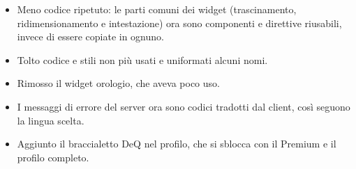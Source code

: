 \begin{itemize}[itemsep=-2pt]
    \item Meno codice ripetuto: le parti comuni dei widget (trascinamento, ridimensionamento e intestazione) ora sono componenti e direttive riusabili, invece di essere copiate in ognuno.
    \item Tolto codice e stili non più usati e uniformati alcuni nomi.
    \item Rimosso il widget orologio, che aveva poco uso.
    \item I messaggi di errore del server ora sono codici tradotti dal client, così seguono la lingua scelta.
    \item Aggiunto il braccialetto DeQ nel profilo, che si sblocca con il Premium e il profilo completo.
\end{itemize}